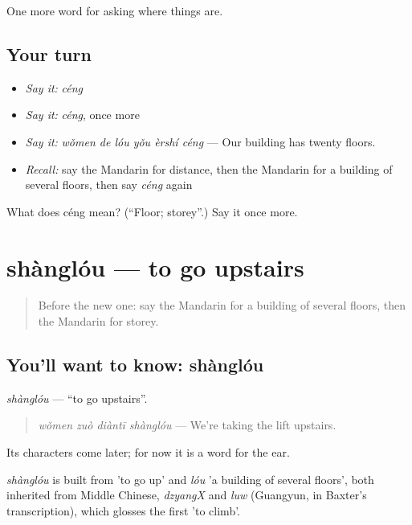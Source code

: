 \begin{grammarlens}[title={What you've built}]
One more word for asking where things are.
\end{grammarlens}

\subsection*{Your turn}
\begin{itemize}
\raggedright
  \item \emph{Say it:} \emph{céng}
  \item \emph{Say it:} \emph{céng}, once more
  \item \emph{Say it:} \emph{wǒmen de lóu yǒu èrshí céng} — Our building has twenty floors.
  \item \emph{Recall:} say the Mandarin for distance, then the Mandarin for a building of several floors, then say \emph{céng} again
\end{itemize}

\begin{tcolorbox}[breakable,colback=teal!4,colframe=teal!35!black,title={Before you move on}]
What does céng mean? (\textquotedblleft{}Floor; storey\textquotedblright{}.) Say it once more.
\end{tcolorbox}
\section[shànglóu]{shànglóu — to go upstairs}

\label{lesson:ZH-C206-shanglou}



\begin{quote}
Before the new one: say the Mandarin for a building of several floors, then the Mandarin for storey.
\end{quote}

\subsection*{You'll want to know: shànglóu}
\emph{shànglóu} — \textquotedblleft{}to go upstairs\textquotedblright{}.

\begin{quote}
\emph{wǒmen zuò diàntī shànglóu} — We're taking the lift upstairs.
\end{quote}

Its characters come later; for now it is a word for the ear.

\begin{cousinweb}
\emph{shànglóu} is built from  'to go up' and \emph{lóu} 'a building of several floors', both inherited from Middle Chinese, \emph{dzyangX} and \emph{luw} (Guangyun, in Baxter's transcription), which glosses the first 'to climb'.
\end{cousinweb}

